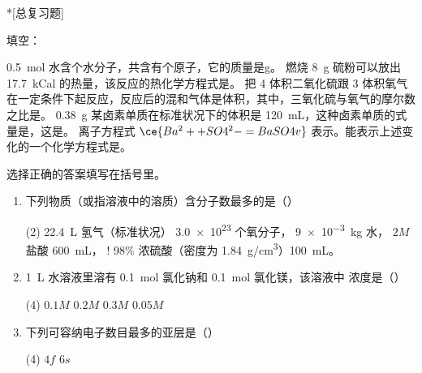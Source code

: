 \begin{Exercise}*[总复习题]
  \begin{question}
    \item 填空：
    \begin{tasks}
      \task \qty{0.5}{mol} 水含个水分子，共含有个原子，它的质量是\unit{g}。
      \task 燃烧 \qty{8}{g} 硫粉可以放出 \qty{17.7}{kCal} 的热量，该反应的热化学方程式是。
      \task 把 4 体积二氧化硫跟 3 体积氧气在一定条件下起反应，反应后的混和气体是体积，其中，三氧化硫与氧气的摩尔数之比是。
      \task \qty{0.38}{g} 某卤素单质在标准状况下的体积是 \qty{120}{mL}，这种卤素单质的式量是，这是。
      \task 离子方程式 $\ce{Ba^2+ + SO4^2- = BaSO4 v}$ 表示。能表示上述变化的一个化学方程式是\CJKunderline[hidden]{\hspace{5.5cm}}。
    \end{tasks}
    \item 选择正确的答案填写在括号里。
    \begin{enumerate}[itemindent=2.2em]
      \item 下列物质（或指溶液中的溶质）含分子数最多的是\hfill（\qquad ）
      \begin{tasks}[item-indent=4.5em,label=\Alph*.](2)
        \task \qty{22.4}{L} 氢气（标准状况）
        \task \num{3.0e23} 个氧分子，
        \task \qty{9e-3}{kg} 水，
        \task $2M$ 盐酸 \qty{600}{mL}，
        \task! 98\% 浓硫酸（密度为 \qty{1.84}{g/cm^3}）\qty{100}{mL}。
      \end{tasks}
      \item \qty{1}{L} 水溶液里溶有 \qty{0.1}{mol} 氯化钠和 \qty{0.1}{mol} 氯化镁，该溶液中  浓度是\linebreak\mbox{}\hfill（\qquad ）
      \begin{tasks}[item-indent=4.5em,label=\Alph*.](4)
        \task $0.1M$
        \task $0.2M$
        \task $0.3M$
        \task $0.05M$
      \end{tasks}
      \item 下列可容纳电子数目最多的亚层是\hfill（\qquad ）
      \begin{tasks}[item-indent=4.5em,label=\Alph*.](4)
        \task $4f$
        \task $6s$

\end{tasks}
\end{enumerate}
\end{question}
\end{Exercise}
